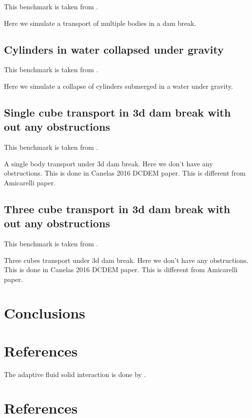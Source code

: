 \documentclass[preprint,12pt]{elsarticle}
\begin{document}
This benchmark is taken from \citet{wang2019numerical}.

Here we simulate a transport of multiple bodies in a dam break.


\subsection{Cylinders in water collapsed under gravity}
\label{sec:cylinders-in-water-collapsed-under-gravity}

This benchmark is taken from \citet{chen2019coupled}.

Here we simulate a collapse of cylinders submerged in a water under gravity.


\subsection{Single cube transport in 3d dam break with out any obstructions}
\label{sec:single-cube-transport-in-3d-dam-break-with-out-any-obstructions}

This benchmark is taken from \citet{ji2019coupled}.

A single body transport under 3d dam break. Here we don't have any
obstructions. This is done in Canelas 2016 DCDEM paper. This is different from
Amicarelli paper.


\subsection{Three cube transport in 3d dam break with out any obstructions}
\label{sec:three-cube-transport-in-3d-dam-break-with-out-any-obstructions}

This benchmark is taken from \citet{ji2019coupled}.

Three cubes transport under 3d dam break. Here we don't have any obstructions.
This is done in Canelas 2016 DCDEM paper. This is different from Amicarelli
paper.


\section{Conclusions}
\label{sec:conclusions}


\section*{References}
\label{sec:references}

The adaptive fluid solid interaction is done by \citet{hu2019consistent}.


\section*{References}


\end{document}

